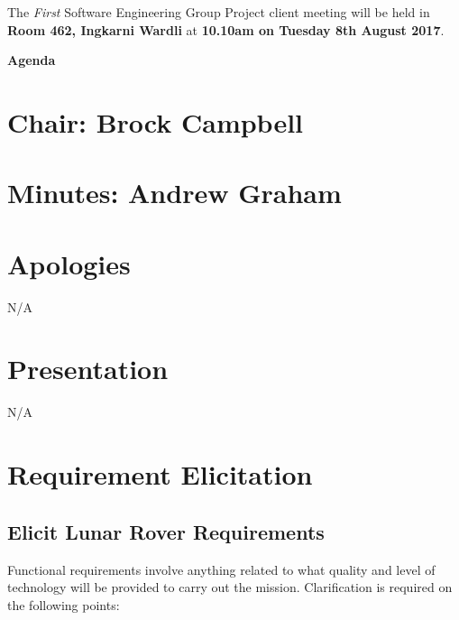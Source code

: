 \documentclass[11pt, a4paper]{article}
\newcommand{\meetingno}{First}
\newcommand{\meetinglocation}{Room 462, Ingkarni Wardli} %
\newcommand{\meetingdatetime}{10.10am on Tuesday 8th August 2017} %
\newcommand{\meetingchair}{ Brock Campbell } %
\newcommand{\meetingminutes}{ Andrew Graham }
\begin{document}
  \noindent The {\em \meetingno} Software Engineering Group Project client meeting will be held in {\bf \meetinglocation } at {\bf \meetingdatetime }.

  \vspace*{15pt}

  \begin{center}
  \huge \bf Agenda
  \end{center}


\begin{flushleft}

  \section*{Chair: \meetingchair }
  \section*{Minutes: \meetingminutes }
  

  \vspace*{10pt}

  \section{Apologies}
  N/A %

  \section{Presentation}
  N/A

  \section{Requirement Elicitation}

  \subsection{Elicit Lunar Rover Requirements}
  Functional requirements involve anything related to what quality and level of technology will be provided to carry out the mission. Clarification is required on the following points:


\end{flushleft}
\end{document}
